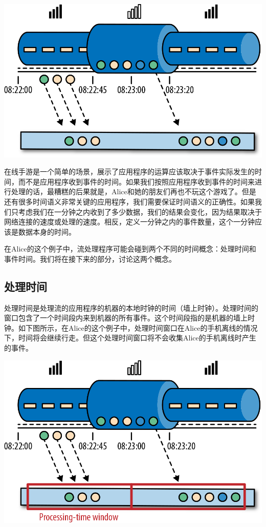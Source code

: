 \documentclass[oneside]{ctexbook}
\begin{document}
\noindent\includegraphics[width=\textwidth]{spaf_0211.png}

在线手游是一个简单的场景，展示了应用程序的运算应该取决于事件实际发生的时间，而不是应用程序收到事件的时间。如果我们按照应用程序收到事件的时间来进行处理的话，最糟糕的后果就是，Alice和她的朋友们再也不玩这个游戏了。但是还有很多时间语义非常关键的应用程序，我们需要保证时间语义的正确性。如果我们只考虑我们在一分钟之内收到了多少数据，我们的结果会变化，因为结果取决于网络连接的速度或处理的速度。相反，定义一分钟之内的事件数量，这个一分钟应该是数据本身的时间。

在Alice的这个例子中，流处理程序可能会碰到两个不同的时间概念：处理时间和事件时间。我们将在接下来的部分，讨论这两个概念。

\subsection{处理时间}

处理时间是处理流的应用程序的机器的本地时钟的时间（墙上时钟）。处理时间的窗口包含了一个时间段内来到机器的所有事件。这个时间段指的是机器的墙上时钟。如下图所示，在Alice的这个例子中，处理时间窗口在Alice的手机离线的情况下，时间将会继续行走。但这个处理时间窗口将不会收集Alice的手机离线时产生的事件。

\noindent\includegraphics[width=\textwidth]{spaf_0212.png}
\end{document}
